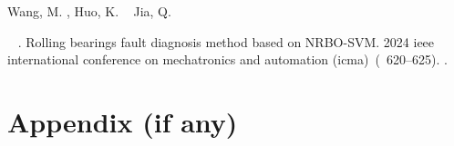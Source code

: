 \documentclass{jcd}
\theoremstyle{plain}
\theoremstyle{definition}
\begin{document}
\begin{thebibliography}{}
  \begin{APACrefauthors}%
  Wang, M.%
  , Huo, K.%
  \BCBL {}\ \BBA {} Jia, Q.%
  \end{APACrefauthors}%
  \unskip\
  \newblock
  .
  \newblock
  {\BBOQ} {Rolling bearings fault diagnosis method based on {NRBO}-{SVM}}.{\BBCQ}
  \newblock
  \BIn{}  {2024 ieee international conference on mechatronics and automation (icma)}\ (\BPGS\ 620--625).
  \newblock
  .
  \newblock
  \begin{APACrefDOI}  \end{APACrefDOI}
  \PrintBackRefs{\CurrentBib}
\end{thebibliography}

\vfil
\balance


\switchonecolumn
\section{Appendix (if any)}
\end{document}
